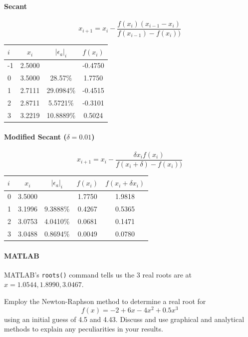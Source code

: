 \documentclass{article}
\begin{document}
\paragraph{Secant}
\[ x_{i+1} = x_{i} - \frac{f(x_{i})(x_{i-1}-x_{i})}{f(x_{i-1})-f(x_{i}))} \]
\begin{center}
	\begin{tabular}{| l c c | c |}
\hline
$i$	&	$x_{i}$	&	$| \epsilon_a |_{i}$	&	$f(x_{i})$\\
\hline
-1	&	2.5000	&							&	-0.4750\\
0	&	3.5000	&	28.57\%					&	1.7750\\
1	&	2.7111	&	29.0984\%				&	-0.4515\\
2	&	2.8711	&	5.5721\%				&	-0.3101\\
3	&	3.2219	&	10.8889\%				&	0.5024\\
\hline
	\end{tabular}
\end{center}

\paragraph{Modified Secant ($\delta=0.01$)}
\[ x_{i+1} = x_{i} - \frac{\delta x_{i}f(x_{i})}{f(x_{i}+\delta)-f(x_{i}))} \]
\begin{center}
	\begin{tabular}{| l c c | c c |}
\hline
$i$	&	$x_{i}$	&	$| \epsilon_a |_{i}$	&	$f(x_{i})$	&	$f(x_{i}+\delta x_{i})$	\\
\hline
0	&	3.5000	&							&	1.7750		&	1.9818\\
1	&	3.1996	&	9.3888\%				&	0.4267		&	0.5365\\
2	&	3.0753	&	4.0410\%				&	0.0681		&	0.1471\\
3	&	3.0488	&	0.8694\%				&	0.0049		&	0.0780\\
\hline
	\end{tabular}
\end{center}

\paragraph{MATLAB\\}
MATLAB's \verb|roots()| command tells us the 3 real roots are at $x=1.0544,1.8990,3.0467$.


\setcounter{problem}{8}
\begin{problem}
Employ the Newton-Raphson method to determine a real root for
\[ f(x) = -2 + 6x - 4x^{2} + 0.5x^{3} \]
using an initial guess of 4.5 and 4.43. Discuss and use graphical and analytical methods to explain any peculiarities in your results.
\end{problem}
\end{document}
